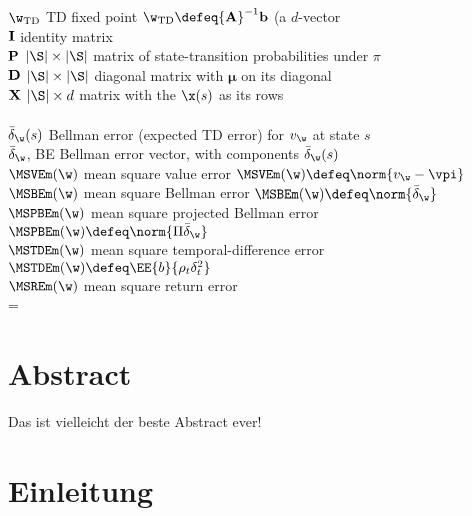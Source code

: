 \documentclass[a4paper,titlepage]{article}
\numberwithin{equation}{section} %
\begin{document}
\>$\w_{\rm TD}$       \> TD fixed point $\w_{\rm TD}\defeq {\bf A}^{-1}{\bf b}$ (a $d$-vector\\
\>${\bf I}$           \> identity matrix\\
\>${\bf P}$           \> $|\S|\times |\S|$ matrix of state-transition probabilities under $\pi$\\
\>${\bf D}$           \> $|\S|\times |\S|$ diagonal matrix with $\bm\mu$ on its diagonal\\
\>${\bf X}$           \> $|\S|\times d$ matrix with the $\x(s)$ as its rows\\
\\
\>$\bar\delta_\w(s)$  \> Bellman error (expected TD error) for $v_\w$ at state $s$\\
\>$\bar\delta_\w$, BE \> Bellman error vector, with components $\bar\delta_\w(s)$\\
\>$\MSVEm(\w)$        \> mean square value error $\MSVEm(\w)\defeq\norm{v_\w-\vpi}$\\
\>$\MSBEm(\w)$        \> mean square Bellman error $\MSBEm(\w)\defeq\norm{\bar\delta_\w}$\\
\>$\MSPBEm(\w)$       \> mean square projected Bellman error $\MSPBEm(\w)\defeq\norm{\Pi\bar\delta_\w}$\\
\>$\MSTDEm(\w)$       \> mean square temporal-difference error $\MSTDEm(\w)\defeq\EE{b}{\rho_t\delta_t^2}$ \\
\>$\MSREm(\w)$        \> mean square return error\\



\emergencystretch=\maxdimen
{}

\newpage

\section*{\hfil Abstract\hfil}
\begin{changemargin}{4cm}{4cm}
	Das ist vielleicht der beste Abstract ever!
\end{changemargin}
\section{Einleitung}
\end{document}
